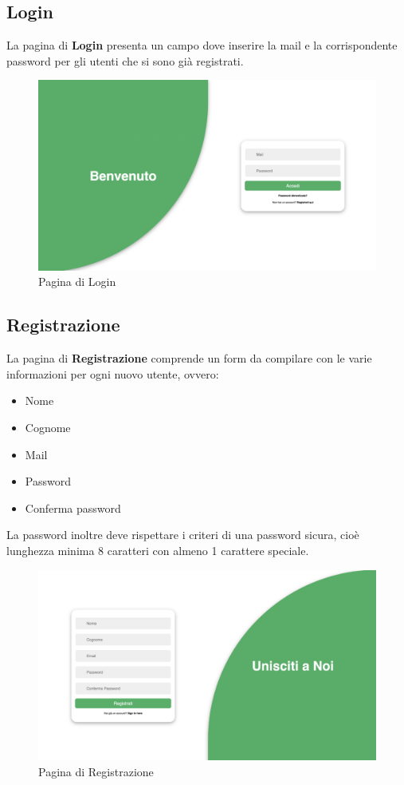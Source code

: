 \documentclass{article}
\begin{document}
 \subsection{Login}
 La pagina di \textbf{Login} presenta un campo dove inserire la mail e la corrispondente password per gli utenti che si sono già registrati.
    \begin{figure}[H]
     \centering
     \includegraphics[width=130mm]{D4/Images/Login.png}
     \caption{Pagina di Login}
    \end{figure}

\subsection{Registrazione}
La pagina di \textbf{Registrazione} comprende un form da compilare con le varie informazioni per ogni nuovo utente, ovvero: 
\begin{itemize}
    \item Nome
    \item Cognome
    \item Mail
    \item Password
    \item Conferma password
\end{itemize}
La password inoltre deve rispettare i criteri di una password sicura, cioè lunghezza minima 8 caratteri con almeno 1 carattere speciale.
\begin{figure}[H]
    \centering
    \includegraphics[width=130mm]{D4/Images/signUp.png}
    \caption{Pagina di Registrazione}
\end{figure}
\\
\end{document}
